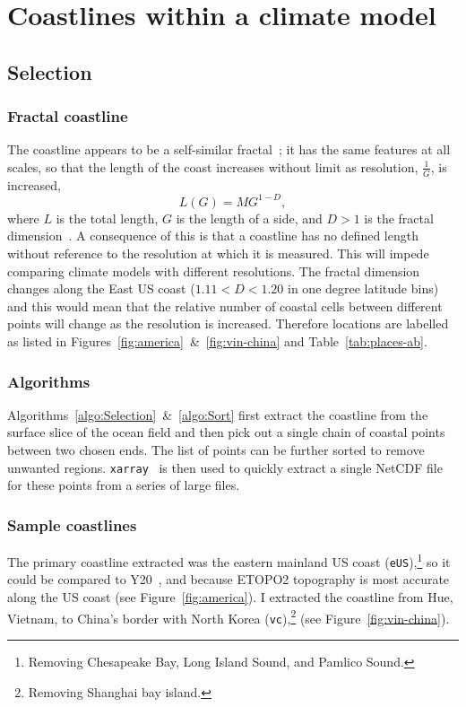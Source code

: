 

\section{Coastlines within a climate model}
\label{sec:coast}
\subsection{Selection}
 \subsubsection{Fractal coastline}
 \label{sec:fractal}
 The coastline appears to be a self-similar fractal~\cite{mandelbrot1967long,
 richardson1961problem}; it has the same features at all
 scales, so that the length of the coast increases without limit as resolution, $\frac{1}{G}$,
 is increased,
 \begin{equation}
 L(G)=M G^{1-D},
 \end{equation}
 where $L$ is the total length, $G$ is the length of a side,
 and $D>1$ is the fractal dimension~\cite{mandelbrot1967long}.
 A consequence of this is that a coastline has no defined length without
 reference to the resolution at which it is measured.
 This will impede comparing
 climate models with different resolutions.
 The fractal dimension changes
  along the East US coast ($1.11<D<1.20$ in one degree latitude bins)~\cite{jiang1998fractal}
 and this would mean that the relative number of coastal cells between different
 points will change as the resolution is increased.
 Therefore locations are labelled as listed in
 Figures~\ref{fig:america}~\&~\ref{fig:vin-china} and Table~\ref{tab:places-ab}.

\subsubsection{Algorithms}
\label{sec:coast-algorithms}
Algorithms~\ref{algo:Selection}~\&~\ref{algo:Sort} first extract the coastline
from the surface slice of the ocean field and then pick out a single chain of
coastal points between two chosen ends. The list of points can be further
sorted to remove unwanted regions.
\texttt{xarray}~\cite{hoyer2017xarray} is then used to quickly extract
a single NetCDF file for these points from a series of large files.





\subsubsection{Sample coastlines}
\label{sec:coast-sample}
The primary coastline extracted was the eastern mainland US coast (\texttt{eUS}),\footnote{
Removing Chesapeake Bay, Long Island Sound, and Pamlico Sound.
}
so it could be compared to Y20~\cite{ZannaPreprint},
and because ETOPO2 topography is most accurate along the
US coast (see Figure~\ref{fig:america}).
I extracted the coastline from Hue, Vietnam, to China's
border with North Korea (\texttt{vc}),\footnote{
Removing Shanghai bay island.} (see Figure~\ref{fig:vin-china}).

